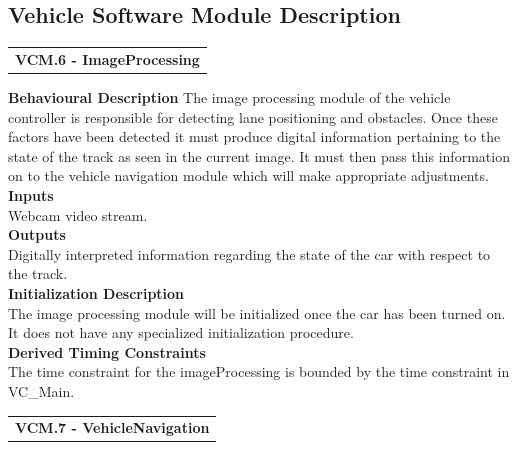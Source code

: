 \documentclass [10pt]{article}
\begin{document}
\subsection{Vehicle Software Module Description}


\begin{longtable}{p{}}
\rowcolor{tableCell}\textbf{VCM.6 - ImageProcessing} \\
\end{longtable}



\textbf{Behavioural Description} 
    The image processing module of the vehicle controller is responsible for detecting lane positioning and obstacles. Once these factors have been detected it must produce
    digital information pertaining to the state of the track as seen in the current image. It must then pass this information on to the vehicle navigation module which will make appropriate adjustments.
    \\

\textbf{Inputs} \\
    Webcam video stream.\\

\textbf{Outputs} \\
    Digitally interpreted information regarding the state of the car with respect to the track. \\

\textbf{Initialization Description} \\
    The image processing module will be initialized once the car has been turned on. It does not have any specialized initialization procedure.
    \\

\textbf{Derived Timing Constraints} \\
   The time constraint for the imageProcessing is bounded by the time constraint in VC\_Main.\\
    
    
    
    

\begin{longtable}{p{}}
\rowcolor{tableCell}\textbf{VCM.7 - VehicleNavigation} \\
\end{longtable}
\end{document}
